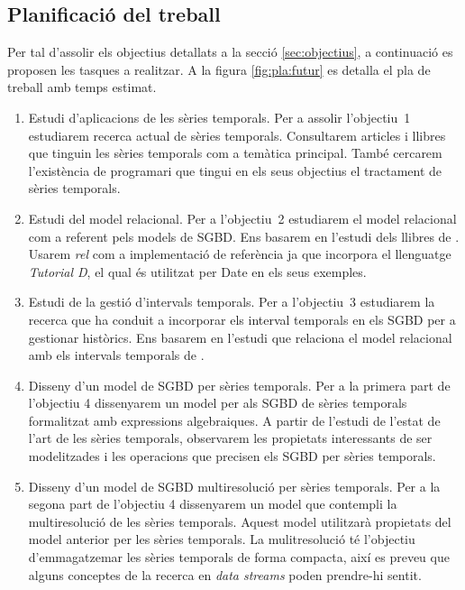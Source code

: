 \subsection*{Planificació del treball}


Per tal d'assolir els objectius detallats a la secció
\ref{sec:objectius}, a continuació es proposen les tasques a
realitzar.  A la figura \ref{fig:pla:futur} es detalla el pla de
treball amb temps estimat.





\begin{enumerate}


\item Estudi d'aplicacions de les sèries temporals. Per a assolir
  l'objectiu~1 estudiarem recerca actual de sèries temporals.
  Consultarem articles i llibres que tinguin les sèries temporals com
  a temàtica principal. També cercarem l'existència de programari que
  tingui en els seus objectius el tractament de sèries temporals.

\item Estudi del model relacional. Per a l'objectiu~2 estudiarem el
  model relacional com a referent pels models de SGBD. Ens basarem en
  l'estudi dels llibres de
  \textcite{date:introduction,date06,date:dictionary}. Usarem
  \emph{rel} \parencite{rel} com a implementació de referència ja que
  incorpora el llenguatge \emph{Tutorial D}, el qual és utilitzat per
  Date en els seus exemples.

\item Estudi de la gestió d'intervals temporals. Per a l'objectiu~3
  estudiarem la recerca que ha conduit a incorporar els interval
  temporals en els SGBD per a gestionar històrics. Ens basarem en
  l'estudi que relaciona el model relacional amb els intervals
  temporals de \textcite{date02:_tempor_data_relat_model}.

\item Disseny d'un model de SGBD per sèries temporals. Per a la
  primera part de l'objectiu 4 dissenyarem un model per als SGBD de
  sèries temporals formalitzat amb expressions algebraiques. A partir
  de l'estudi de l'estat de l'art de les sèries temporals, observarem
  les propietats interessants de ser modelitzades i les operacions que
  precisen els SGBD per sèries temporals.

\item Disseny d'un model de SGBD multiresolució per sèries
  temporals. Per a la segona part de l'objectiu 4 dissenyarem un model
  que contempli la multiresolució de les sèries temporals. Aquest
  model utilitzarà propietats del model anterior per les sèries
  temporals. La mulitresolució té l'objectiu d'emmagatzemar les sèries
  temporals de forma compacta, així es preveu que alguns conceptes de la recerca
  en \emph{data streams} poden prendre-hi sentit.


\end{enumerate}
